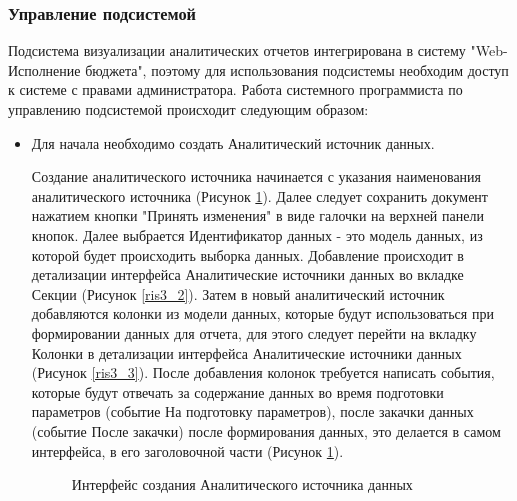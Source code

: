 \documentclass[a4paper]{extarticle}
\numberwithin{equation}{section}
\begin{document}
\subsubsection{Управление подсистемой}
Подсистема визуализации аналитических отчетов интегрирована в систему "Web-Исполнение бюджета", поэтому для использования подсистемы необходим доступ к системе с правами администратора. Работа системного программиста по управлению подсистемой происходит следующим образом:
\begin{itemize}
	\item Для начала необходимо создать Аналитический источник данных.\par
	Создание аналитического источника начинается с указания наименования аналитического источника (Рисунок \ref{ris3_1}). Далее следует сохранить документ нажатием кнопки "Принять изменения" в виде галочки на верхней панели кнопок. Далее выбрается Идентификатор данных - это модель данных, из которой будет происходить выборка данных. Добавление происходит в детализации интерфейса Аналитические источники данных во вкладке Секции (Рисунок \ref{ris3_2}). Затем в новый аналитический источник добавляются колонки из модели данных, которые будут использоваться при формировании данных для отчета, для этого следует перейти на вкладку Колонки в детализации интерфейса Аналитические источники данных (Рисунок \ref{ris3_3}). После добавления колонок требуется написать события, которые будут отвечать за содержание данных во время подготовки параметров (событие На подготовку параметров), после закачки данных (событие После закачки) после формирования данных, это делается в самом интерфейса, в его заголовочной части (Рисунок \ref{ris3_1}).
\begin{figure}[H]
\caption{Интерфейс создания Аналитического источника данных}
\label{ris3_1}
\end{figure}\par
\begin{figure}[H]

\end{figure}
\end{itemize}
\end{document}
